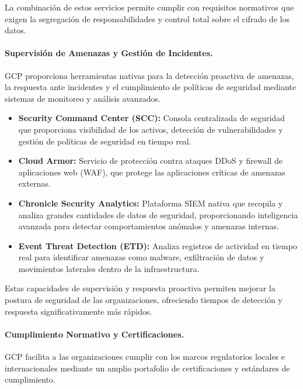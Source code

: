 {                La combinación de estos servicios permite cumplir con requisitos normativos que exigen la segregación de responsabilidades y control total sobre el cifrado de los datos.
            
                \paragraph{Supervisión de Amenazas y Gestión de Incidentes.}
                GCP proporciona herramientas nativas para la detección proactiva de amenazas, la respuesta ante incidentes y el cumplimiento de políticas de seguridad mediante sistemas de monitoreo y análisis avanzados.
            
                \begin{itemize}
                    \item \textbf{Security Command Center (SCC):} Consola centralizada de seguridad que proporciona visibilidad de los activos, detección de vulnerabilidades y gestión de políticas de seguridad en tiempo real.
                    \item \textbf{Cloud Armor:} Servicio de protección contra ataques DDoS y firewall de aplicaciones web (WAF), que protege las aplicaciones críticas de amenazas externas. 
                    \item \textbf{Chronicle Security Analytics:} Plataforma SIEM nativa que recopila y analiza grandes cantidades de datos de seguridad, proporcionando inteligencia avanzada para detectar comportamientos anómalos y amenazas internas.
                    \item \textbf{Event Threat Detection (ETD):} Analiza registros de actividad en tiempo real para identificar amenazas como malware, exfiltración de datos y movimientos laterales dentro de la infraestructura.
                \end{itemize}
                
                Estas capacidades de supervisión y respuesta proactiva permiten mejorar la postura de seguridad de las organizaciones, ofreciendo tiempos de detección y respuesta significativamente más rápidos.
            
                \paragraph{Cumplimiento Normativo y Certificaciones.}
                GCP facilita a las organizaciones cumplir con los marcos regulatorios locales e internacionales mediante un amplio portafolio de certificaciones y estándares de cumplimiento.
            
}
